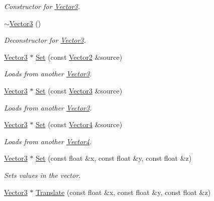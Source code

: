 \begin{DoxyCompactItemize}
\begin{DoxyCompactList}\small\item\em Constructor for \hyperlink{class_flounder_1_1_vector3}{Vector3}. \end{DoxyCompactList}\item 
\hyperlink{class_flounder_1_1_vector3_a0c96dbb5fe339a5b1e364cdb383744aa}{$\sim$\+Vector3} ()
\begin{DoxyCompactList}\small\item\em Deconstructor for \hyperlink{class_flounder_1_1_vector3}{Vector3}. \end{DoxyCompactList}\item 
\hyperlink{class_flounder_1_1_vector3}{Vector3} $\ast$ \hyperlink{class_flounder_1_1_vector3_a39f86aa416fb78da896877379ad74e39}{Set} (const \hyperlink{class_flounder_1_1_vector2}{Vector2} \&source)
\begin{DoxyCompactList}\small\item\em Loads from another \hyperlink{class_flounder_1_1_vector3}{Vector3}. \end{DoxyCompactList}\item 
\hyperlink{class_flounder_1_1_vector3}{Vector3} $\ast$ \hyperlink{class_flounder_1_1_vector3_aa87dd594f1e830cd42a260079d7a9ac2}{Set} (const \hyperlink{class_flounder_1_1_vector3}{Vector3} \&source)
\begin{DoxyCompactList}\small\item\em Loads from another \hyperlink{class_flounder_1_1_vector3}{Vector3}. \end{DoxyCompactList}\item 
\hyperlink{class_flounder_1_1_vector3}{Vector3} $\ast$ \hyperlink{class_flounder_1_1_vector3_a125216eaa159914258f5aadf9f986a47}{Set} (const \hyperlink{class_flounder_1_1_vector4}{Vector4} \&source)
\begin{DoxyCompactList}\small\item\em Loads from another \hyperlink{class_flounder_1_1_vector4}{Vector4}. \end{DoxyCompactList}\item 
\hyperlink{class_flounder_1_1_vector3}{Vector3} $\ast$ \hyperlink{class_flounder_1_1_vector3_a79418f90ec1a3889a39c4a6f6077dfeb}{Set} (const float \&x, const float \&y, const float \&z)
\begin{DoxyCompactList}\small\item\em Sets values in the vector. \end{DoxyCompactList}\item 
\hyperlink{class_flounder_1_1_vector3}{Vector3} $\ast$ \hyperlink{class_flounder_1_1_vector3_af9e355fa045b0db0d0d166ae0c17434a}{Translate} (const float \&x, const float \&y, const float \&z)

\end{DoxyCompactItemize}
